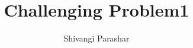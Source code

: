 \documentclass[journal,12pt,twocolumn]{IEEEtran}
\begin{document}
\makeatletter
{}
\makeatother
\let\StandardTheFigure\thefigure
\let\vec\mathbf
\renewcommand{\thefigure}{\theproblem}
\def\putbox#1#2#3{\makebox[0in][l]{\makebox[#1][l]{}\raisebox{\baselineskip}[0in][0in]{\raisebox{#2}[0in][0in]{#3}}}}
     \def\rightbox#1{\makebox[0in][r]{#1}}
     \def\centbox#1{\makebox[0in]{#1}}
     \def\topbox#1{\raisebox{-\baselineskip}[0in][0in]{#1}}
     \def\midbox#1{\raisebox{-0.5\baselineskip}[0in][0in]{#1}}
\vspace{3cm}
\title{Challenging Problem1}
\author{Shivangi Parashar} 
%
%
%
% 
%
\end{document}
